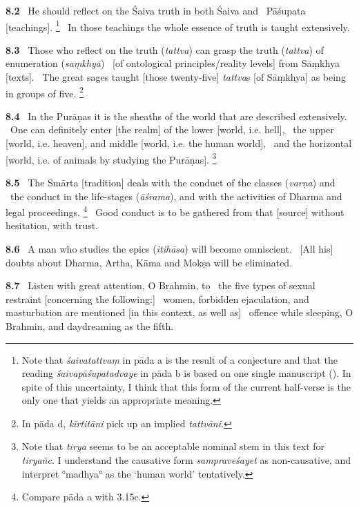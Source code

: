 \documentclass{article}
\newcommand{\skt}[1]{\textit{#1}}
\begin{document}
\textbf{8.2}%
\ He should reflect on the Śaiva truth in both Śaiva and%
\                 Pāśupata [teachings].%
\footnote{Note that \skt{śaivatattvaṃ} in pāda a is the result of a conjecture and that the reading \skt{śaivapāśupatadvaye}                       in pāda b is based on one single manuscript (\msP). In spite of this uncertainty,                       I think that this form of the current half-verse is the only one that yields an appropriate meaning. }%
\ In those teachings the whole essence of truth is taught extensively.%


\textbf{8.3}%
\ Those who reflect on the truth (\skt{tattva}) can grasp the truth (\skt{tattva}) of enumeration (\skt{saṃkhyā})%
\                 [of ontological principles/reality levels] from Sāṃkhya [texts].%
\ The great sages taught [those twenty-five] \skt{tattva}s [of Sāṃkhya] as being in groups of five.%
\footnote{In pāda d, \skt{kīrtitāni} pick up an implied \skt{tattvāni}. }%


\textbf{8.4}%
\ In the Purāṇas it is the sheaths of the world that are described extensively.%
\ One can definitely enter [the realm] of the lower [world, i.e. hell],%
\                  the upper [world, i.e. heaven], and middle [world, i.e. the human world],%
\                  and the horizontal [world, i.e. of animals by studying the Purāṇas].%
\footnote{Note that \skt{tirya} seems to be an acceptable nominal stem in this text for \skt{tiryañc}.               I understand the causative form \skt{sampraveśayet} as non-causative, and               interpret °madhya° as the `human world' tentatively. }%


\textbf{8.5}%
\ The Smārta [tradition] deals with the conduct of the classes (\skt{varṇa}) and%
\                 the conduct in the life-stages (\skt{āśrama}), and with the activities of Dharma and legal proceedings.%
\footnote{Compare pāda a with 3.15c. }%
\ Good conduct is to be gathered from that [source] without hesitation, with trust.%


\textbf{8.6}%
\ A man who studies the epics (\skt{itihāsa}) will become omniscient.%
\ [All his] doubts about Dharma, Artha, Kāma and Mokṣa will be eliminated.%


\textbf{8.7}%
\ Listen with great attention, O Brahmin, to%
\                         the five types of sexual restraint [concerning the following:]%
\ women, forbidden ejaculation, and masturbation are mentioned [in this context, as well as]%
\ offence while sleeping, O Brahmin, and daydreaming as the fifth.%
\end{document}
